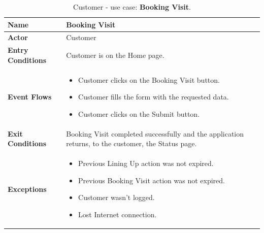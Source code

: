 \begin{table}[H]
\centering
\begin{tabular}{| m{} | m{} |} 
	\hline
	\textbf{Name} & Booking Visit \\ 
	\hline
	\textbf{Actor} & Customer \\ 
	\hline
	\textbf{Entry Conditions} & Customer is on the Home page. \\ 
	\hline
	\textbf{Event Flows} &
	\begin{itemize}
	\item Customer clicks on the Booking Visit button.
	\item Customer fills the form with the requested data.
	\item Customer clicks on the Submit button.
	\end{itemize} \\ 
	\hline
	\textbf{Exit Conditions} & Booking Visit completed successfully and the application returns, to the customer, the Status page. \\ 
	\hline
	\textbf{Exceptions} &
	\begin{itemize}
	\item Previous Lining Up action was not expired.
	\item Previous Booking Visit action was not expired.
	\item Customer wasn't logged.
	\item Lost Internet connection.
	\end{itemize} \\ 
	\hline
\end{tabular}
\caption{Customer - use case: \textbf{Booking Visit}.}
\label{tableBookingVisit}
\end{table}

